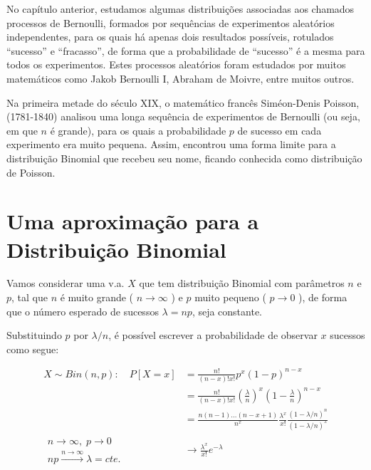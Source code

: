 \documentclass[
]{book}
\theoremstyle{definition}
\theoremstyle{definition}
\theoremstyle{definition}
\theoremstyle{remark}
\begin{document}
No capítulo anterior, estudamos algumas distribuições associadas aos chamados processos de Bernoulli, formados por sequências de experimentos aleatórios independentes, para os quais há apenas dois resultados possíveis, rotulados ``sucesso'' e ``fracasso'', de forma que a probabilidade de ``sucesso'' é a mesma para todos os experimentos. Estes processos aleatórios foram estudados por muitos matemáticos como Jakob Bernoulli I, Abraham de Moivre, entre muitos outros.

Na primeira metade do século XIX, o matemático francês Siméon-Denis Poisson, (1781-1840) analisou uma longa sequência de experimentos de Bernoulli (ou seja, em que \(n\) é grande), para os quais a probabilidade \(p\) de sucesso em cada experimento era muito pequena. Assim, encontrou uma forma limite para a distribuição Binomial que recebeu seu nome, ficando conhecida como distribuição de Poisson.

\hypertarget{uma-aproximauxe7uxe3o-para-a-distribuiuxe7uxe3o-binomial}{%
\section{Uma aproximação para a Distribuição Binomial}\label{uma-aproximauxe7uxe3o-para-a-distribuiuxe7uxe3o-binomial}}

Vamos considerar uma v.a. \(X\) que tem distribuição Binomial com parâmetros \(n\) e \(p\), tal que \(n\) é muito grande ( \(n \rightarrow \infty\) ) e \(p\) muito pequeno ( \(p \rightarrow 0\) ), de forma que o número esperado de sucessos \(\lambda = np\), seja constante.

Substituindo \(p\) por \(\lambda/n\), é possível escrever a probabilidade de observar \(x\) sucessos como segue:

\begin{align*}
  X \sim \mathit{Bin}(n, p): \quad P[X = x] &= \frac{n!}{(n-x)!x!} p^x (1-p)^{n-x}\\
           &= \frac{n!}{(n-x)!x!} \left(\frac{\lambda}{n}\right)^x \left(1-\frac{\lambda}{n}\right)^{n-x}\\
           &= \frac{n(n-1)\ldots(n-x+1)}{n^x} \frac{\lambda^x}{x!} \frac{(1- \lambda/n)^n}{(1- \lambda/n)^x}\\
  \begin{array}{l} 
    n \rightarrow \infty, \; p \rightarrow 0\\ 
    np \stackrel{n \rightarrow \infty}{\longrightarrow}\lambda = cte.
  \end{array}&\longrightarrow \frac{\lambda^x}{x!}e^{-\lambda}\\\\
\end{align*}
\end{document}
